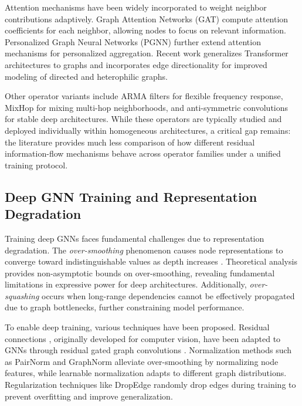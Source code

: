 Attention mechanisms have been widely incorporated to weight neighbor contributions adaptively. Graph Attention Networks (GAT) \cite{velivckovic2017graph} compute attention coefficients for each neighbor, allowing nodes to focus on relevant information. Personalized Graph Neural Networks (PGNN) \cite{zhang2019personalized} further extend attention mechanisms for personalized aggregation. Recent work generalizes Transformer architectures to graphs \cite{dwivedi2020generalization} and incorporates edge directionality \cite{beaini2020directional, rossi2023edge} for improved modeling of directed and heterophilic graphs.

Other operator variants include ARMA filters \cite{bianchi2020graph} for flexible frequency response, MixHop \cite{abu2019mixhop} for mixing multi-hop neighborhoods, and anti-symmetric convolutions \cite{gravina2022anti} for stable deep architectures. While these operators are typically studied and deployed individually within homogeneous architectures, a critical gap remains: the literature provides much less comparison of how different residual information-flow mechanisms behave across operator families under a unified training protocol.

\subsection{Deep GNN Training and Representation Degradation}

Training deep GNNs faces fundamental challenges due to representation degradation. The \textit{over-smoothing} phenomenon causes node representations to converge toward indistinguishable values as depth increases \cite{li2018deeper, chen2023revisiting, li2023non}. Theoretical analysis \cite{li2023non} provides non-asymptotic bounds on over-smoothing, revealing fundamental limitations in expressive power for deep architectures. Additionally, \textit{over-squashing} \cite{topping2021understanding, alon2020bottleneck} occurs when long-range dependencies cannot be effectively propagated due to graph bottlenecks, further constraining model performance.

To enable deep training, various techniques have been proposed. Residual connections \cite{he2016deep}, originally developed for computer vision, have been adapted to GNNs through residual gated graph convolutions \cite{bresson2017residual}. Normalization methods such as PairNorm \cite{zhao2020pair} and GraphNorm \cite{cai2021graphnorm} alleviate over-smoothing by normalizing node features, while learnable normalization \cite{li2022learning} adapts to different graph distributions. Regularization techniques like DropEdge \cite{rong2019dropedge} randomly drop edges during training to prevent overfitting and improve generalization.


